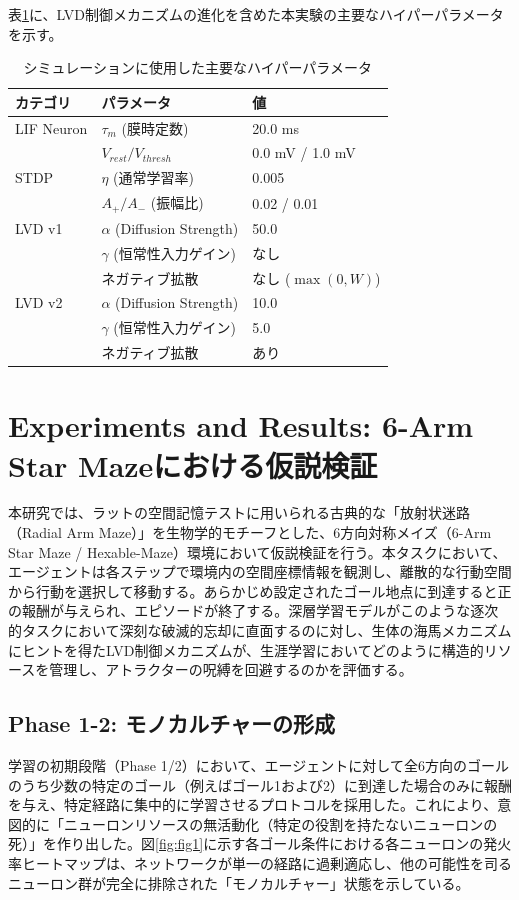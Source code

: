 \documentclass[submit]{ipsj}
\begin{document}
表\ref{tab:hyperparams}に、LVD制御メカニズムの進化を含めた本実験の主要なハイパーパラメータを示す。

\begin{table}[htbp]
\centering
\caption{シミュレーションに使用した主要なハイパーパラメータ}
\label{tab:hyperparams}
\begin{tabular}{lll}
\toprule
カテゴリ & パラメータ & 値 \\ \midrule
LIF Neuron & $\tau_m$ (膜時定数) & 20.0 ms \\ 
 & $V_{rest} / V_{thresh}$ & 0.0 mV / 1.0 mV \\ \midrule
STDP & $\eta$ (通常学習率) & 0.005 \\ 
 & $A_+ / A_-$ (振幅比) & 0.02 / 0.01 \\ \midrule
LVD v1 & $\alpha$ (Diffusion Strength) & 50.0 \\ 
 & $\gamma$ (恒常性入力ゲイン) & なし \\
 & ネガティブ拡散 & なし ($\max(0, W)$) \\ \midrule
LVD v2 & $\alpha$ (Diffusion Strength) & 10.0 \\ 
 & $\gamma$ (恒常性入力ゲイン) & 5.0 \\
 & ネガティブ拡散 & あり \\ \bottomrule
\end{tabular}
\end{table}

\section{Experiments and Results: 6-Arm Star Mazeにおける仮説検証}

本研究では、ラットの空間記憶テストに用いられる古典的な「放射状迷路（Radial Arm Maze）」\cite{olton1976spatial}を生物学的モチーフとした、6方向対称メイズ（6-Arm Star Maze / Hexable-Maze）環境において仮説検証を行う。本タスクにおいて、エージェントは各ステップで環境内の空間座標情報を観測し、離散的な行動空間から行動を選択して移動する。あらかじめ設定されたゴール地点に到達すると正の報酬が与えられ、エピソードが終了する。深層学習モデルがこのような逐次的タスクにおいて深刻な破滅的忘却\cite{mccloskey1989catastrophic}に直面するのに対し、生体の海馬メカニズムにヒントを得たLVD制御メカニズムが、生涯学習においてどのように構造的リソースを管理し、アトラクターの呪縛を回避するのかを評価する。

\subsection{Phase 1-2: モノカルチャーの形成}
学習の初期段階（Phase 1/2）において、エージェントに対して全6方向のゴールのうち少数の特定のゴール（例えばゴール1および2）に到達した場合のみに報酬を与え、特定経路に集中的に学習させるプロトコルを採用した。これにより、意図的に「ニューロンリソースの無活動化（特定の役割を持たないニューロンの死）」を作り出した。図\ref{fig:fig1}に示す各ゴール条件における各ニューロンの発火率ヒートマップは、ネットワークが単一の経路に過剰適応し、他の可能性を司るニューロン群が完全に排除された「モノカルチャー」状態を示している。
\end{document}
